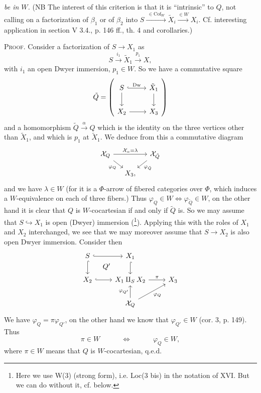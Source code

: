 \documentclass[11pt]{article}
\newcommand{\printedpage}[1]{\marginpar{\footnotesize p.~#1}}
\newcommand{\msp}[1]{\marginpar{\footnotesize [#1]}}
\newcommand{\Cof}{\mathrm{Cof}}
\begin{document}
\printedpage{171}
\textit{be in $W$.} (NB The interest of this criterion is that it is ``intrinsic'' to $Q$, not calling on a factorization of $\beta_1$ or of $\beta_2$ into $S \xrightarrow{\;\in \Cof_W\;} \tilde{X}_i \xrightarrow{\in W} X_i$. Cf. interesting application in section V 3.4., p. 146 ff., th. 4 and corollaries.)

\msp{page 263}
\textsc{Proof.} Consider a factorization of $S \longrightarrow X_1$ as
\[
S \xrightarrow{i_1} \tilde{X}_1 \xrightarrow{p_1} X, %
\]
with $i_1$ an open Dwyer immersion, $p_1 \in W$. So we have a commutative square
\[
\tilde{Q} = \left(
\begin{tikzcd}[ampersand replacement=\&]
S \arrow[r, hook, "\mathrm{Dw}"] \arrow[d] \& \tilde{X}_1 \arrow[d] \\
X_2 \arrow[r] \& X_3
\end{tikzcd}
\right)
\]
and a homomorphism $\tilde{Q} \xrightarrow{\alpha} Q$ which is the identity on the three vertices other than $\tilde{X}_1$, and which is $p_1$ at $\tilde{X}_1$. We deduce from this a commutative diagram
\[
\begin{tikzcd}[ampersand replacement=\&, row sep=small, column sep=small]
\mathcal{X}_Q \arrow[rr, "\mathcal{X}_\alpha = \lambda"] \arrow[dr, "\varphi_Q"'] \& \& \mathcal{X}_{\tilde{Q}} \arrow[dl, "\varphi_{\tilde{Q}}"] \\
 \& X_3, \&
\end{tikzcd}
\]
and we have $\lambda \in W$ (for it is a $\Phi$-arrow of fibered categories over $\Phi$, which induces a $W$-equivalence on each of three fibers.) Thus $\varphi_Q \in W \iff \varphi_{\tilde{Q}} \in W$, on the other hand it is clear that $Q$ is $W$-cocartesian if and only if $\tilde{Q}$ is. So we may assume that $S \hookrightarrow X_1$ is open (Dwyer) immersion (\footnote[134]{Here we use W(3) (strong form), i.e. Loc(3 bis) in the notation of XVI. But we can do without it, cf. below.}). Applying this
\msp{page 264}
with the roles of $X_1$ and $X_2$ interchanged, we see that we may moreover assume that $S \longrightarrow X_2$ is also open Dwyer immersion. Consider then
\[
\begin{tikzcd}[ampersand replacement=\&]
S \arrow[r, hook] \arrow[d, hook] \arrow[dr, phantom, "Q'"] \& X_1 \arrow[d, hook] \& \\
X_2 \arrow[r, hook] \& X_1 \amalg_S X_2 \arrow[r, "\pi"] \& X_3 \\
 \& \mathcal{X}_Q \arrow[u, "\varphi_{Q'}"] \arrow[ur, "\varphi_Q"'] \&
\end{tikzcd}
\]
\printedpage{172}
We have $\varphi_Q = \pi\varphi_{Q'}$, on the other hand we know that $\varphi_{Q'} \in W$ (cor. 3, p. 149). Thus
\[
\pi \in W \qquad\quad \iff \qquad\quad \varphi_Q \in W,
\]
where $\pi \in W$ means that $Q$ is $W$-cocartesian, q.e.d.
\end{document}
